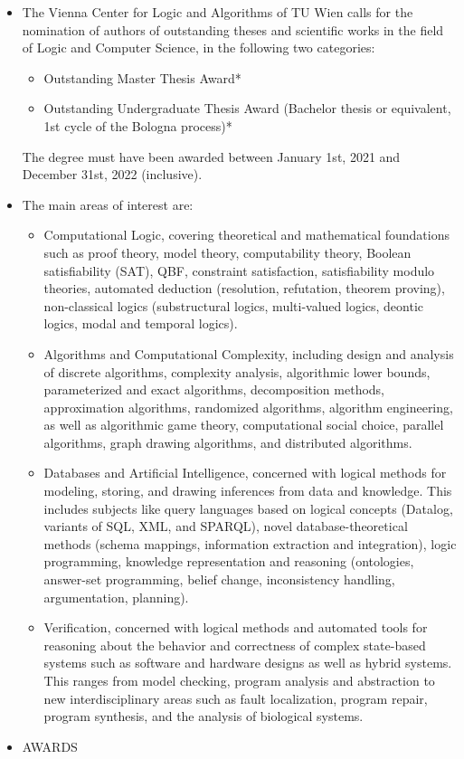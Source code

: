 \documentclass[prodmode,acmtecs]{acmsmall} %
\begin{document}
\begin{itemize}\item   The Vienna Center for Logic and Algorithms of TU Wien calls for the nomination of authors of outstanding theses and scientific works in the field of Logic and Computer Science, in the following two categories: 
 
\begin{itemize}\item  Outstanding Master Thesis Award*
\item  Outstanding Undergraduate Thesis Award (Bachelor thesis or equivalent, 1st cycle of the Bologna process)*
\end{itemize} 
  The degree must have been awarded between January 1st, 2021 and December 31st, 2022 (inclusive). 
 
\item  The main areas of interest are: 
 
\begin{itemize}\item  Computational Logic, covering theoretical and mathematical foundations such as proof theory, model theory, computability theory, Boolean satisfiability (SAT), QBF, constraint satisfaction, satisfiability modulo theories, automated deduction (resolution, refutation, theorem proving), non-classical logics (substructural logics, multi-valued logics, deontic logics, modal and temporal logics).
\item  Algorithms and Computational Complexity, including design and analysis of discrete algorithms, complexity analysis, algorithmic lower bounds, parameterized and exact algorithms, decomposition methods, approximation algorithms, randomized algorithms, algorithm engineering, as well as algorithmic game theory, computational social choice, parallel algorithms, graph drawing algorithms, and distributed algorithms.
\item  Databases and Artificial Intelligence, concerned with logical methods for modeling, storing, and drawing inferences from data and knowledge. This includes subjects like query languages based on logical concepts (Datalog, variants of SQL, XML, and SPARQL), novel database-theoretical methods (schema mappings, information extraction and integration), logic programming, knowledge representation and reasoning (ontologies, answer-set programming, belief change, inconsistency handling, argumentation, planning).
\item  Verification, concerned with logical methods and automated tools for reasoning about the behavior and correctness of complex state-based systems such as software and hardware designs as well as hybrid systems. This ranges from model checking, program analysis and abstraction to new interdisciplinary areas such as fault localization, program repair, program synthesis, and the analysis of biological systems.
\end{itemize} 
\item  AWARDS 
 

\end{itemize}
\end{document}

